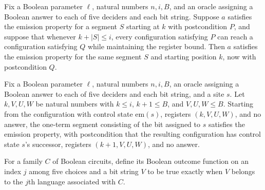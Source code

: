 \begin{lemma}
\label{BoolCircuit.AdjWalk.Em.cont}
\leanok
{}
Fix a Boolean parameter $\ell$, natural numbers $n,i,B$, and an oracle assigning a
Boolean answer to each of five deciders and each bit string. Suppose $a$ satisfies the
emission property for a segment $S$ starting at $k$ with postcondition $P$, and suppose
that whenever $k+|S|\le i$, every configuration satisfying $P$ can reach a configuration
satisfying $Q$ while maintaining the register bound. Then $a$ satisfies the emission
property for the same segment $S$ and starting position $k$, now with postcondition $Q$.
\end{lemma}

\begin{lemma}
\label{BoolCircuit.AdjWalk.Em.emit}
\leanok
{}
Fix a Boolean parameter $\ell$, natural numbers $n,i,B$, an oracle assigning a Boolean
answer to each of five deciders and each bit string, and a site $s$. Let $k,V,U,W$ be
natural numbers with $k\le i$, $k+1\le B$, and $V,U,W\le B$. Starting from the
configuration with control state $\mathrm{em}(s)$, registers $(k,V,U,W)$, and no answer,
the one-term segment consisting of the bit assigned to $s$ satisfies the emission
property, with postcondition that the resulting configuration has control state $s$'s
successor, registers $(k+1,V,U,W)$, and no answer.
\end{lemma}

\begin{definition}
\label{BoolCircuit.AdjWalk.orc}
\leanok
{}
For a family $C$ of Boolean circuits, define its Boolean outcome function on an index
$j$ among five choices and a bit string $V$ to be true exactly when $V$ belongs to the
$j$th language associated with $C$.
\end{definition}

